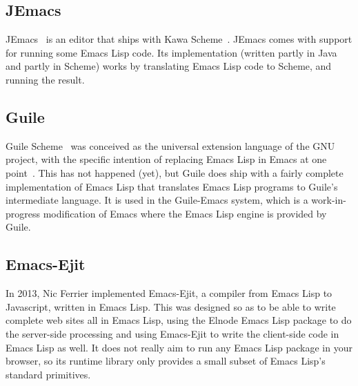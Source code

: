 \documentclass[format=acmsmall, review]{acmart}
\newcommand \Elisp {Emacs Lisp}
\begin{document}
\subsection{JEmacs}

JEmacs~\cite{Bothner2001} is an editor that ships with Kawa
Scheme~\cite{KawaScheme}.  JEmacs comes with support for running some
\Elisp{} code.  Its implementation (written partly in Java and
partly in Scheme) works by translating \Elisp{} code to Scheme, and
running the result.

\subsection{Guile}

Guile Scheme~\cite{Guile2018} was conceived as the universal extension
language of the GNU project, with the specific intention of replacing
\Elisp{} in Emacs at one point~\cite{WhyNotTcl}.  This has not happened (yet), but Guile does
ship with a fairly complete implementation of \Elisp{} that translates
\Elisp{} programs to Guile's intermediate language.  It is used in the
Guile-Emacs system, which is a work-in-progress modification of Emacs where
the \Elisp{} engine is provided by Guile.

\subsection{Emacs-Ejit}

In 2013, Nic Ferrier implemented Emacs-Ejit, a compiler from \Elisp{} to
Javascript, written in \Elisp{}.  This was designed so as to be able to write complete web sites
all in \Elisp{}, using the Elnode \Elisp{} package to do the server-side
processing and using Emacs-Ejit to write the client-side code in \Elisp{}
as well.  It does not really aim to run any \Elisp{} package in your
browser, so its runtime library only provides a small subset of \Elisp's
standard primitives.

\clearpage %



\end{document}
